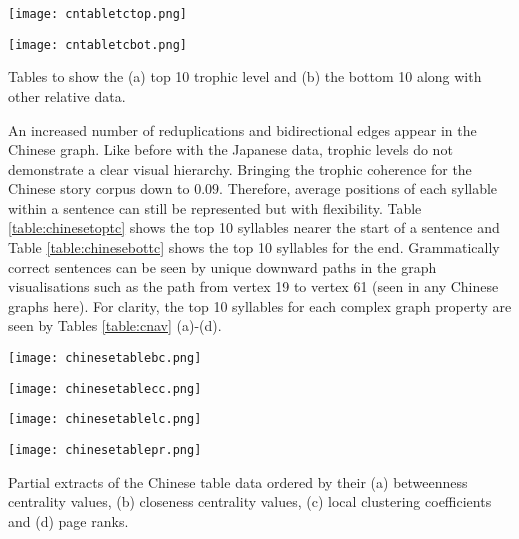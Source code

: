 \begin{table}[!htb]
\centering
\begin{subtable}{.45\textwidth}
	\centering
	\texttt{[image: cntabletctop.png]}
	\caption{}
	\label{table:chinesetoptc}
\end{subtable}
\hfill
\begin{subtable}{.45\textwidth}
	\centering
	\texttt{[image: cntabletcbot.png]}
	\caption{}
	\label{table:chinesebottc}
\end{subtable}
\caption{Tables to show the (a) top 10 trophic level and (b) the bottom 10 along with other relative data.}
\end{table}

An increased number of reduplications and bidirectional edges appear in the Chinese graph. Like before with the Japanese data, trophic levels do not demonstrate a clear visual hierarchy. Bringing the trophic coherence for the Chinese story corpus down to $0.09$. Therefore, average positions of each syllable within a sentence can still be represented but with flexibility. Table \ref{table:chinesetoptc} shows the top 10 syllables nearer the start of a sentence and Table \ref{table:chinesebottc} shows the top 10 syllables for the end. Grammatically correct sentences can be seen by unique downward paths in the graph visualisations such as the path from vertex 19 to vertex 61 (seen in any Chinese graphs here). For clarity, the top 10 syllables for each complex graph property are seen by Tables \ref{table:cnav} (a)-(d).

\begin{table}[!htb]
\centering
\begin{subtable}{.2\textwidth}
	\centering
	\texttt{[image: chinesetablebc.png]}
	\caption{}
	\label{table:chinesetablebc}
\end{subtable}
\hfill
\begin{subtable}{.2\textwidth}
	\centering
	\texttt{[image: chinesetablecc.png]}
	\caption{}
	\label{table:chinesetablecc}
\end{subtable}
\hfill
\begin{subtable}{.2\textwidth}
	\centering
	\texttt{[image: chinesetablelc.png]}
	\caption{}
	\label{table:chinesetablelc}
\end{subtable}
\hfill
\begin{subtable}{.2\textwidth}
	\centering
	\texttt{[image: chinesetablepr.png]}
	\caption{}
	\label{table:chinesetablepr}
\end{subtable}
\caption{Partial extracts of the Chinese table data ordered by their (a) betweenness centrality values, (b) closeness centrality values, (c) local clustering coefficients and (d) page ranks.}
\label{table:cnav}
\end{table}

